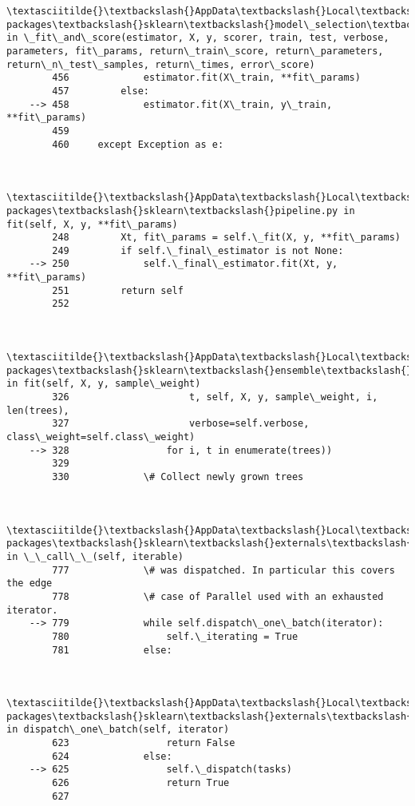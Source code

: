 \documentclass[11pt]{article}
\begin{document}
\begin{Verbatim}[commandchars=\\\{\}]
        \textasciitilde{}\textbackslash{}AppData\textbackslash{}Local\textbackslash{}Continuum\textbackslash{}anaconda3\textbackslash{}lib\textbackslash{}site-packages\textbackslash{}sklearn\textbackslash{}model\_selection\textbackslash{}\_validation.py in \_fit\_and\_score(estimator, X, y, scorer, train, test, verbose, parameters, fit\_params, return\_train\_score, return\_parameters, return\_n\_test\_samples, return\_times, error\_score)
        456             estimator.fit(X\_train, **fit\_params)
        457         else:
    --> 458             estimator.fit(X\_train, y\_train, **fit\_params)
        459 
        460     except Exception as e:
    

        \textasciitilde{}\textbackslash{}AppData\textbackslash{}Local\textbackslash{}Continuum\textbackslash{}anaconda3\textbackslash{}lib\textbackslash{}site-packages\textbackslash{}sklearn\textbackslash{}pipeline.py in fit(self, X, y, **fit\_params)
        248         Xt, fit\_params = self.\_fit(X, y, **fit\_params)
        249         if self.\_final\_estimator is not None:
    --> 250             self.\_final\_estimator.fit(Xt, y, **fit\_params)
        251         return self
        252 
    

        \textasciitilde{}\textbackslash{}AppData\textbackslash{}Local\textbackslash{}Continuum\textbackslash{}anaconda3\textbackslash{}lib\textbackslash{}site-packages\textbackslash{}sklearn\textbackslash{}ensemble\textbackslash{}forest.py in fit(self, X, y, sample\_weight)
        326                     t, self, X, y, sample\_weight, i, len(trees),
        327                     verbose=self.verbose, class\_weight=self.class\_weight)
    --> 328                 for i, t in enumerate(trees))
        329 
        330             \# Collect newly grown trees
    

        \textasciitilde{}\textbackslash{}AppData\textbackslash{}Local\textbackslash{}Continuum\textbackslash{}anaconda3\textbackslash{}lib\textbackslash{}site-packages\textbackslash{}sklearn\textbackslash{}externals\textbackslash{}joblib\textbackslash{}parallel.py in \_\_call\_\_(self, iterable)
        777             \# was dispatched. In particular this covers the edge
        778             \# case of Parallel used with an exhausted iterator.
    --> 779             while self.dispatch\_one\_batch(iterator):
        780                 self.\_iterating = True
        781             else:
    

        \textasciitilde{}\textbackslash{}AppData\textbackslash{}Local\textbackslash{}Continuum\textbackslash{}anaconda3\textbackslash{}lib\textbackslash{}site-packages\textbackslash{}sklearn\textbackslash{}externals\textbackslash{}joblib\textbackslash{}parallel.py in dispatch\_one\_batch(self, iterator)
        623                 return False
        624             else:
    --> 625                 self.\_dispatch(tasks)
        626                 return True
        627 
    


\end{Verbatim}
\end{document}
